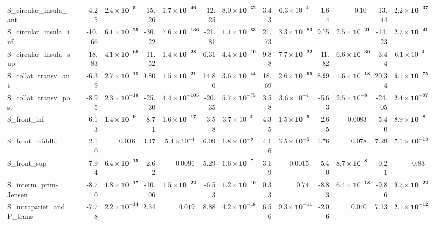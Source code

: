{\begin{longtable}{llrrrrrrrrrrrr}
S\_circular\_insula\_ant &  & -4.25 & $\mathbf{2.4{\times}10^{-5}}$ & -15.26 & $\mathbf{1.7{\times}10^{-46}}$ & -12.25 & $\mathbf{8.0{\times}10^{-32}}$ & 3.43 & $6.3{\times}10^{-4}$ & -1.64 & $0.10$ & -13.44 & $\mathbf{2.2{\times}10^{-37}}$ \\
S\_circular\_insula\_inf &  & -10.66 & $\mathbf{6.1{\times}10^{-25}}$ & -30.22 & $\mathbf{7.6{\times}10^{-136}}$ & -21.81 & $\mathbf{1.1{\times}10^{-83}}$ & 21.73 & $\mathbf{3.3{\times}10^{-83}}$ & 9.75 & $\mathbf{2.5{\times}10^{-21}}$ & -14.23 & $\mathbf{2.7{\times}10^{-41}}$ \\
S\_circular\_insula\_sup &  & -18.83 & $\mathbf{4.1{\times}10^{-66}}$ & -11.52 & $\mathbf{1.4{\times}10^{-28}}$ & 6.31 & $\mathbf{4.4{\times}10^{-10}}$ & 9.88 & $\mathbf{7.7{\times}10^{-22}}$ & -11.82 & $\mathbf{6.6{\times}10^{-30}}$ & -3.44 & $6.1{\times}10^{-4}$ \\
S\_collat\_transv\_ant &  & -6.39 & $\mathbf{2.7{\times}10^{-10}}$ & 9.80 & $\mathbf{1.5{\times}10^{-21}}$ & 14.80 & $\mathbf{3.6{\times}10^{-44}}$ & 18.69 & $\mathbf{2.6{\times}10^{-65}}$ & 8.99 & $\mathbf{1.6{\times}10^{-18}}$ & 20.34 & $\mathbf{6.1{\times}10^{-75}}$ \\
S\_collat\_transv\_post &  & -8.95 & $\mathbf{2.3{\times}10^{-18}}$ & -25.30 & $\mathbf{4.4{\times}10^{-105}}$ & -20.35 & $\mathbf{5.7{\times}10^{-75}}$ & 3.58 & $3.6{\times}10^{-4}$ & -5.63 & $\mathbf{2.5{\times}10^{-8}}$ & -24.05 & $\mathbf{2.4{\times}10^{-97}}$ \\
S\_front\_inf &  & -6.13 & $\mathbf{1.4{\times}10^{-9}}$ & -8.71 & $\mathbf{1.6{\times}10^{-17}}$ & -3.58 & $3.7{\times}10^{-4}$ & 4.35 & $\mathbf{1.5{\times}10^{-5}}$ & -2.65 & $0.0083$ & -5.40 & $\mathbf{8.9{\times}10^{-8}}$ \\
S\_front\_middle &  & -2.10 & $0.036$ & 3.47 & $5.4{\times}10^{-4}$ & 6.09 & $\mathbf{1.8{\times}10^{-9}}$ & 4.16 & $\mathbf{3.5{\times}10^{-5}}$ & 1.76 & $0.078$ & 7.29 & $\mathbf{7.1{\times}10^{-13}}$ \\
S\_front\_sup &  & -7.94 & $\mathbf{6.4{\times}10^{-15}}$ & -2.62 & $0.0091$ & 5.29 & $\mathbf{1.6{\times}10^{-7}}$ & 3.19 & $0.0015$ & -5.40 & $\mathbf{8.7{\times}10^{-8}}$ & -0.21 & $0.83$ \\
S\_interm\_prim-Jensen &  & -8.70 & $\mathbf{1.8{\times}10^{-17}}$ & -10.06 & $\mathbf{1.5{\times}10^{-22}}$ & -6.53 & $\mathbf{1.2{\times}10^{-10}}$ & 0.33 & $0.74$ & -8.83 & $\mathbf{6.4{\times}10^{-18}}$ & -9.86 & $\mathbf{9.7{\times}10^{-22}}$ \\
S\_intrapariet\_and\_P\_trans &  & -7.78 & $\mathbf{2.2{\times}10^{-14}}$ & 2.34 & $0.019$ & 8.88 & $\mathbf{4.2{\times}10^{-18}}$ & 6.56 & $\mathbf{9.3{\times}10^{-11}}$ & -2.06 & $0.040$ & 7.13 & $\mathbf{2.1{\times}10^{-12}}$ \\

\end{longtable}}
